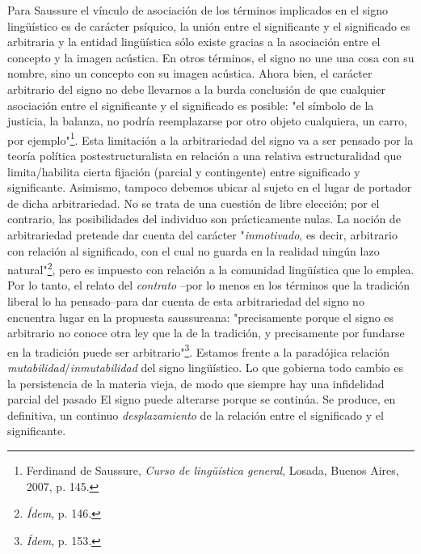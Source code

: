 \documentclass{book}
\begin{document}
Para Saussure el vínculo de asociación de los términos implicados en el
signo lingüístico es de carácter psíquico, la unión entre el
significante y el significado es arbitraria y la entidad lingüística
sólo existe gracias a la asociación entre el concepto y la imagen
acústica. En otros términos, el signo no une una cosa con su nombre,
sino un concepto con su imagen acústica. Ahora bien, el carácter
arbitrario del signo no debe llevarnos a la burda conclusión de que
cualquier asociación entre el significante y el significado es posible:
"el símbolo de la justicia, la balanza, no podría reemplazarse por otro
objeto cualquiera, un carro, por ejemplo"\footnote{Ferdinand de
  Saussure, \emph{Curso de lingüística general}, Losada, Buenos Aires,
  2007, p. 145.}. Esta limitación a la arbitrariedad del signo va a ser
pensado por la teoría política postestructuralista en relación a una
relativa estructuralidad que limita/habilita cierta fijación (parcial y
contingente) entre significado y significante. Asimismo, tampoco debemos
ubicar al sujeto en el lugar de portador de dicha arbitrariedad. No se
trata de una cuestión de libre elección; por el contrario, las
posibilidades del individuo son prácticamente nulas. La noción de
arbitrariedad pretende dar cuenta del carácter "\emph{inmotivado}, es
decir, arbitrario con relación al significado, con el cual no guarda en
la realidad ningún lazo natural"\footnote{\emph{Ídem}, p. 146.}, pero es
impuesto con relación a la comunidad lingüística que lo emplea. Por lo
tanto, el relato del \emph{contrato} --por lo menos en los términos que
la tradición liberal lo ha pensado--para dar cuenta de esta
arbitrariedad del signo no encuentra lugar en la propuesta saussureana:
"precisamente porque el signo es arbitrario no conoce otra ley que la de
la tradición, y precisamente por fundarse en la tradición puede ser
arbitrario"\footnote{\emph{Ídem}, p. 153.}. Estamos frente a la
paradójica relación \emph{mutabilidad}/\emph{inmutabilidad} del signo
lingüístico. Lo que gobierna todo cambio es la persistencia de la
materia vieja, de modo que siempre hay una infidelidad parcial del
pasado El signo puede alterarse porque se continúa. Se produce, en
definitiva, un continuo \emph{desplazamiento} de la relación entre el
significado y el significante.
\end{document}

